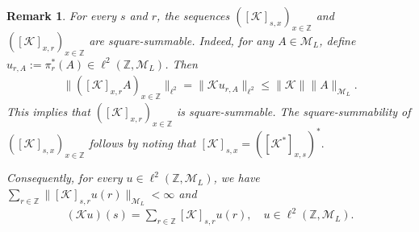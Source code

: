 \documentclass[12pt,oneside,onecolumn,open]{article}
\newtheorem{teo}{Theorem}[section]
\newtheorem{obs}[teo]{Remark}
\begin{document}
\begin{obs}\label{RKsr}
For every $s$ and $r$, the sequences $([\mathcal{K}]_{s,x})_{x \in \mathbb{Z}}$ and $([\mathcal{K}]_{x,r})_{x \in \mathbb{Z}}$ are square-summable. Indeed, for any $A \in \mathcal{M}_L$, define $u_{r,A} := \pi^{*}_{r}(A) \in \ell^{2}(\mathbb{Z},\mathcal{M}_{L})$. Then
\begin{align}\label{KER}
\|([\mathcal{K}]_{x,r}A)_{x \in \mathbb{Z}}\|_{\ell^{2}} = \|\mathcal{K}u_{r,A}\|_{\ell^{2}} \leq \|\mathcal{K}\| \|A\|_{\mathcal{M}_L}.
\end{align}
This implies that $([\mathcal{K}]_{x,r})_{x \in \mathbb{Z}}$ is square-summable. The square-summability of $([\mathcal{K}]_{s,x})_{x \in \mathbb{Z}}$ follows by noting that
$ 
[\mathcal{K}]_{s,x} = \left([\mathcal{K}^*]_{x,s}\right)^*.
$ 

Consequently, for every $u \in \ell^{2}(\mathbb{Z},\mathcal{M}_{L})$, we have $\sum_{r\in \mathbb{Z}} \|[\mathcal{K}]_{s,r}u(r)\|_{\mathcal{M}_L} < \infty$ and
\begin{align}
(\mathcal{K}u)(s) = \sum_{r\in \mathbb{Z}} [\mathcal{K}]_{s,r}u(r), \quad u \in \ell^{2}(\mathbb{Z},\mathcal{M}_{L}).
\end{align}
\end{obs}

 
    






\color{black}


\end{document}
